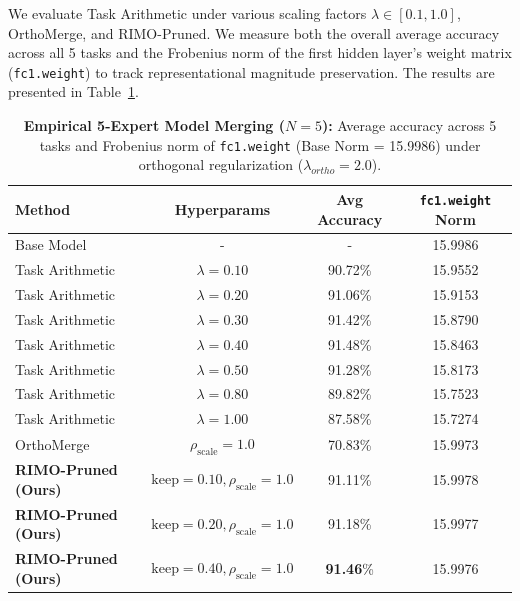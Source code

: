 We evaluate Task Arithmetic under various scaling factors $\lambda \in [0.1, 1.0]$, OrthoMerge, and RIMO-Pruned. We measure both the overall average accuracy across all 5 tasks and the Frobenius norm of the first hidden layer's weight matrix (\texttt{fc1.weight}) to track representational magnitude preservation. The results are presented in Table~\ref{tab:multi_task_results}.

\begin{table}[ht]
\centering
\caption{\textbf{Empirical 5-Expert Model Merging ($N = 5$):} Average accuracy across 5 tasks and Frobenius norm of \texttt{fc1.weight} (Base Norm = 15.9986) under orthogonal regularization ($\lambda_{ortho} = 2.0$).}
\label{tab:multi_task_results}
\vskip 0.1in
\begin{small}
\begin{sc}
\begin{tabular}{lccc}
\toprule
Method & Hyperparams & Avg Accuracy & \texttt{fc1.weight} Norm \\
\midrule
Base Model & - & - & 15.9986 \\
\midrule
Task Arithmetic & $\lambda = 0.10$ & 90.72\% & 15.9552 \\
Task Arithmetic & $\lambda = 0.20$ & 91.06\% & 15.9153 \\
Task Arithmetic & $\lambda = 0.30$ & 91.42\% & 15.8790 \\
Task Arithmetic & $\lambda = 0.40$ & 91.48\% & 15.8463 \\
Task Arithmetic & $\lambda = 0.50$ & 91.28\% & 15.8173 \\
Task Arithmetic & $\lambda = 0.80$ & 89.82\% & 15.7523 \\
Task Arithmetic & $\lambda = 1.00$ & 87.58\% & 15.7274 \\
\midrule
OrthoMerge & $\rho_{\text{scale}} = 1.0$ & 70.83\% & 15.9973 \\
\midrule
\textbf{RIMO-Pruned (Ours)} & $\text{keep} = 0.10, \rho_{\text{scale}} = 1.0$ & 91.11\% & 15.9978 \\
\textbf{RIMO-Pruned (Ours)} & $\text{keep} = 0.20, \rho_{\text{scale}} = 1.0$ & 91.18\% & 15.9977 \\
\textbf{RIMO-Pruned (Ours)} & $\text{keep} = 0.40, \rho_{\text{scale}} = 1.0$ & \textbf{91.46}\% & 15.9976 \\
\bottomrule
\end{tabular}
\end{sc}
\end{small}
\end{table}

